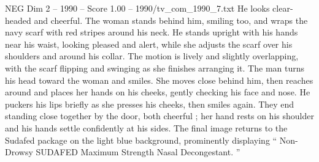 \begin{textsample}{NEG Dim 2 – 1990 – Score 1.00 – 1990/tv\_com\_1990\_7.txt}
He looks clear-headed and cheerful.
The woman stands behind him, smiling too, and wraps the navy scarf with red stripes around his neck.
He stands upright with his hands near his waist, looking pleased and alert, while she adjusts the scarf over his shoulders and around his collar.
The motion is lively and slightly overlapping, with the scarf flipping and swinging as she finishes arranging it.
The man turns his head toward the woman and smiles.
She moves close behind him, then reaches around and places her hands on his cheeks, gently checking his face and nose.
He puckers his lips briefly as she presses his cheeks, then smiles again.
They end standing close together by the door, both cheerful ; her hand rests on his shoulder and his hands settle confidently at his sides.
The final image returns to the Sudafed package on the light blue background, prominently displaying “ Non-Drowsy SUDAFED Maximum Strength Nasal Decongestant. ”

\end{textsample}
